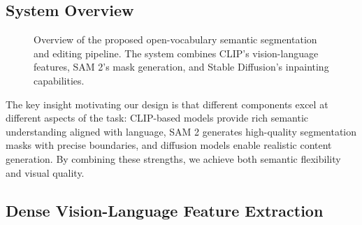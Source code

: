 \subsection{System Overview}

\begin{figure}[h]
\centering
{}
\caption{Overview of the proposed open-vocabulary semantic segmentation and editing pipeline. The system combines CLIP's vision-language features, SAM 2's mask generation, and Stable Diffusion's inpainting capabilities.}
\label{fig:system_pipeline}
\end{figure}

The key insight motivating our design is that different components excel at different aspects of the task: CLIP-based models \cite{radford2021learning} provide rich semantic understanding aligned with language, SAM 2 \cite{ravi2024sam2} generates high-quality segmentation masks with precise boundaries, and diffusion models \cite{rombach2022high} enable realistic content generation. By combining these strengths, we achieve both semantic flexibility and visual quality.

\subsection{Dense Vision-Language Feature Extraction}
\label{sec:dense_features}

